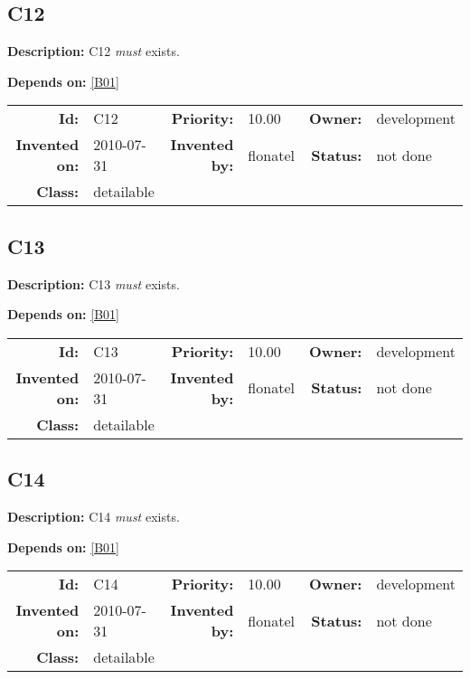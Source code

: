 \subsection{C12}\label{C12}
\textbf{Description:} C12 \textsl{must} exists.

\textbf{Depends on:} \ref{B01} 

\par
{\small \begin{center}\begin{tabular}{rlrlrl}
\textbf{Id:} & C12  & \textbf{Priority:} & 10.00  & \textbf{Owner:} & development\\ 
\textbf{Invented on:} & 2010-07-31  & \textbf{Invented by:} & flonatel  & \textbf{Status:} & not done \\ 
\textbf{Class:} & detailable  & & & \end{tabular}\end{center} }

\subsection{C13}\label{C13}
\textbf{Description:} C13 \textsl{must} exists.

\textbf{Depends on:} \ref{B01} 

\par
{\small \begin{center}\begin{tabular}{rlrlrl}
\textbf{Id:} & C13  & \textbf{Priority:} & 10.00  & \textbf{Owner:} & development\\ 
\textbf{Invented on:} & 2010-07-31  & \textbf{Invented by:} & flonatel  & \textbf{Status:} & not done \\ 
\textbf{Class:} & detailable  & & & \end{tabular}\end{center} }

\subsection{C14}\label{C14}
\textbf{Description:} C14 \textsl{must} exists.

\textbf{Depends on:} \ref{B01} 

\par
{\small \begin{center}\begin{tabular}{rlrlrl}
\textbf{Id:} & C14  & \textbf{Priority:} & 10.00  & \textbf{Owner:} & development\\ 
\textbf{Invented on:} & 2010-07-31  & \textbf{Invented by:} & flonatel  & \textbf{Status:} & not done \\ 
\textbf{Class:} & detailable  & & & \end{tabular}\end{center} }

